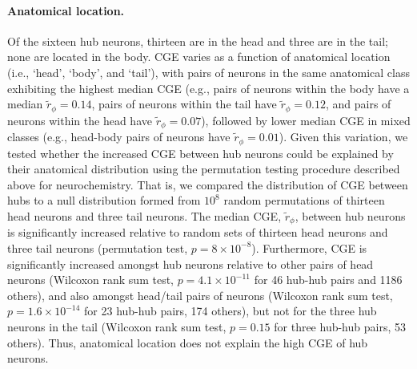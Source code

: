 {\paragraph{Anatomical location.}
Of the sixteen hub neurons, thirteen are in the head and three are in the tail; none are located in the body.
CGE varies as a function of anatomical location (i.e., `head', `body', and `tail'), with pairs of neurons in the same anatomical class exhibiting the highest median CGE (e.g., pairs of neurons within the body have a median $\tilde{r}_\phi = 0.14$, pairs of neurons within the tail have $\tilde{r}_\phi = 0.12$, and pairs of neurons within the head have $\tilde{r}_\phi = 0.07$), followed by lower median CGE in mixed classes (e.g., head-body pairs of neurons have $\tilde{r}_\phi = 0.01$).
Given this variation, we tested whether the increased CGE between hub neurons could be explained by their anatomical distribution using the permutation testing procedure described above for neurochemistry.
That is, we compared the distribution of CGE between hubs to a null distribution formed from $10^8$ random permutations of thirteen head neurons and three tail neurons.
The median CGE, $\tilde{r}_\phi$, between hub neurons is significantly increased relative to random sets of thirteen head neurons and three tail neurons (permutation test, $p = 8\times10^{-8}$).
Furthermore, CGE is significantly increased amongst hub neurons relative to other pairs of head neurons (Wilcoxon rank sum test, $p = 4.1 \times 10^{-11}$ for 46 hub-hub pairs and \num{1186} others),
and also amongst head/tail pairs of neurons (Wilcoxon rank sum test, $p = 1.6 \times 10^{-14}$ for 23 hub-hub pairs, 174 others),
but not for the three hub neurons in the tail (Wilcoxon rank sum test, $p = 0.15$ for three hub-hub pairs, 53 others).
Thus, anatomical location does not explain the high CGE of hub neurons.

}
